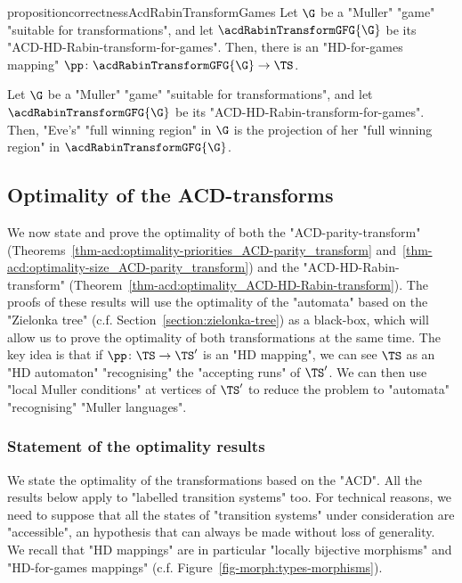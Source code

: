 \documentclass[10pt,a4paper]{amsart}
\newcommand{\Eve}{\mathrm{Eve}}
\begin{document}
\begin{restatable}{proposition}{correctnessAcdRabinTransformGames}\label{prop-ACD:correctness_ACD-HD-Rabin-transform-games}
	Let $\G$ be a "Muller" "game" "suitable for transformations", and let $\acdRabinTransformGFG{\G}$ be its "ACD-HD-Rabin-transform-for-games". Then, there is an "HD-for-games mapping" $\pp\colon \acdRabinTransformGFG{\G} \to \TS$.
\end{restatable}
\begin{corollary}
	Let $\G$ be a "Muller" "game" "suitable for transformations", and let $\acdRabinTransformGFG{\G}$ be its "ACD-HD-Rabin-transform-for-games". Then, "Eve's" "full winning region" in $\G$ is the projection of her "full winning region" in $\acdRabinTransformGFG{\G}$.%
\end{corollary}


\subsection{Optimality of the ACD-transforms}\label{subsec-acd-parity: optimality}
We now state and prove the optimality of both the "ACD-parity-transform" (Theorems~\ref{thm-acd:optimality-priorities_ACD-parity_transform} and~\ref{thm-acd:optimality-size_ACD-parity_transform}) and the "ACD-HD-Rabin-transform" (Theorem~\ref{thm-acd:optimality_ACD-HD-Rabin-transform}).
The proofs of these results will use the optimality of the "automata" based on the "Zielonka tree" (c.f. Section~\ref{section:zielonka-tree}) as a black-box, which will allow us to prove the optimality of both transformations at the same time.
The key idea is that if $\pp\colon \TS \to \TS'$ is an "HD mapping", we can see $\TS$ as an "HD automaton" "recognising" the "accepting runs" of $\TS'$. We can then use "local Muller conditions" at vertices of $\TS'$ to reduce the problem to "automata" "recognising" "Muller languages".

\subsubsection{Statement of the optimality results}
We state the optimality of the transformations based on the "ACD". All the results below apply to "labelled transition systems" too.  For technical reasons, we need to suppose that all the states of "transition systems" under consideration are "accessible", an hypothesis that can always be made without loss of generality. We recall that "HD mappings" are in particular "locally bijective morphisms" and "HD-for-games mappings" (c.f. Figure~\ref{fig-morph:types-morphisms}).
\end{document}
